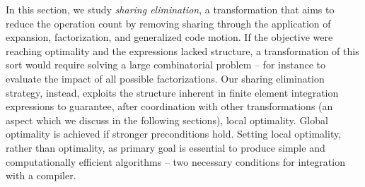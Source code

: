 In this section, we study \textit{sharing elimination}, a transformation that aims to reduce the operation count by removing sharing through the application of expansion, factorization, and generalized code motion. If the objective were reaching optimality and the expressions lacked structure, a transformation of this sort would require solving a large combinatorial problem -- for instance to evaluate the impact of all possible factorizations. Our sharing elimination strategy, instead, exploits the structure inherent in finite element integration expressions to guarantee, after coordination with other transformations (an aspect which we discuss in the following sections), local optimality.  Global optimality is achieved if stronger preconditions hold. Setting local optimality, rather than optimality, as primary goal is essential to produce simple and computationally efficient algorithms -- two necessary conditions for integration with a compiler. 


